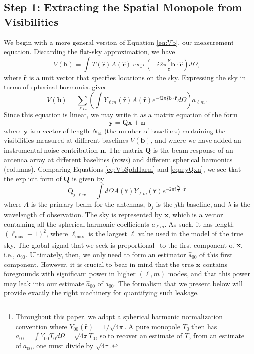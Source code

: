 \documentclass[twocolumn,apj,numberedappendix]{emulateapj}
\newcommand{\y}{\mathbf{y}}
\newcommand{\Q}{\mathbf{Q}}
\newcommand{\Nbl}{N_{\textrm{bl}}}
\begin{document}
\subsection{Step 1: Extracting the Spatial Monopole from Visibilities}

We begin with a more general version of Equation \eqref{eq:Vb}, our measurement equation. Discarding the flat-sky approximation, we have
\begin{equation}
V(\mathbf{b}) = \int  T(\mathbf{\hat{r}}) A(\mathbf{\hat{r}}) \exp \left( -i 2 \pi \frac{\nu}{c} \mathbf{b} \cdot \mathbf{\hat{r}} \right) d\Omega,
\end{equation}
where $\mathbf{\hat{r}}$ is a unit vector that specifies locations on the sky. Expressing the sky in terms of spherical harmonics gives
\begin{equation}
\label{eq:VbSphHarm}
V(\mathbf{b}) = \sum_{\ell m} \left(  \int  Y_{\ell m} (\mathbf{\hat{r}}) A(\mathbf{\hat{r}}) e^{ -i 2 \pi \frac{\nu}{c} \mathbf{b} \cdot \mathbf{\hat{r}}} d\Omega \right) a_{\ell m}.
\end{equation}
Since this equation is linear, we may write it as a matrix equation of the form
\begin{equation}
\y = \Q \mathbf{x} + \mathbf{n}
\label{eqn:yQxn}
\end{equation}
where $\y$ is a vector of length $\Nbl$ (the number of baselines) containing the visibilities measured at different baselines $V(\mathbf{b})$, and where we have added an instrumental noise contribution $\mathbf{n}$. The matrix $\Q$ is the beam response of an antenna array at different baselines (rows) and different spherical harmonics (columns). Comparing Equations \eqref{eq:VbSphHarm} and \eqref{eqn:yQxn}, we see that the explicit form of $\Q$ is given by 
\begin{equation}
\textrm{Q}_{j,\ell m} = \int d\Omega A(\mathbf{\hat{r}}) Y_{\ell m}(\mathbf{\hat{r}}) e^{-2\pi i \frac{\mathbf{b_\textit{j}}}{\lambda} \cdot \mathbf{\hat{r}}}
\label{eqn:Qdef}
\end{equation}
where $A$ is the primary beam for the antennas, $\mathbf{b_{\textit{j}}}$ is the $j$th baseline, and $\lambda$ is the wavelength of observation. The sky is represented by $\mathbf{x}$, which is a vector containing all the spherical harmonic coefficients $a_{\ell m}$. As such, it has length $(\ell_{\textrm{max}}+1)^2$, where $\ell_{\textrm{max}}$ is the largest $\ell$ value used in the model of the true sky. The global signal that we seek is proportional\footnote{Throughout this paper, we adopt a spherical harmonic normalization convention where $Y_{00} (\mathbf{\hat{r}}) = 1/ \sqrt{4\pi}$. A pure monopole $T_0$ then has $a_{00} = \int Y_{00} T_0 d\Omega = \sqrt{4\pi} T_0$, so to recover an estimate of $T_0$ from an estimate of $a_{00}$, one must divide by $\sqrt{4 \pi}$.} to the first component of $\mathbf{x}$, i.e., $a_{00}$. Ultimately, then, we only need to form an estimator $\hat{a}_{00}$ of this first component. However, it is crucial to bear in mind that the true $\mathbf{x}$ contains foregrounds with significant power in higher $(\ell, m)$ modes, and that this power may leak into our estimate $\hat{a}_{00}$ of $a_{00}$. The formalism that we present below will provide exactly the right machinery for quantifying such leakage.
\end{document}
